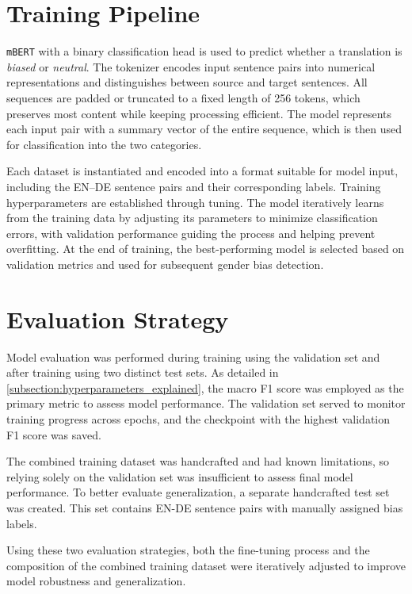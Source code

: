 \section{Training Pipeline}
    \texttt{mBERT} with a binary classification head is used to predict whether a translation is \textit{biased} or \textit{neutral}. The tokenizer encodes input sentence pairs into numerical representations and distinguishes between source and target sentences. All sequences are padded or truncated to a fixed length of 256 tokens, which preserves most content while keeping processing efficient. The model represents each input pair with a summary vector of the entire sequence, which is then used for classification into the two categories.

    Each dataset is instantiated and encoded into a format suitable for model input, including the EN–DE sentence pairs and their corresponding labels. Training hyperparameters are established through tuning. The model iteratively learns from the training data by adjusting its parameters to minimize classification errors, with validation performance guiding the process and helping prevent overfitting. At the end of training, the best-performing model is selected based on validation metrics and used for subsequent gender bias detection.

\section{Evaluation Strategy}
    Model evaluation was performed during training using the validation set and after training using two distinct test sets. As detailed in \autoref{subsection:hyperparameters_explained}, the macro F1 score was employed as the primary metric to assess model performance. The validation set served to monitor training progress across epochs, and the checkpoint with the highest validation F1 score was saved.

    The combined training dataset was handcrafted and had known limitations, so relying solely on the validation set was insufficient to assess final model performance. To better evaluate generalization, a separate handcrafted test set was created. This set contains EN-DE sentence pairs with manually assigned bias labels.

    Using these two evaluation strategies, both the fine-tuning process and the composition of the combined training dataset were iteratively adjusted to improve model robustness and generalization.

